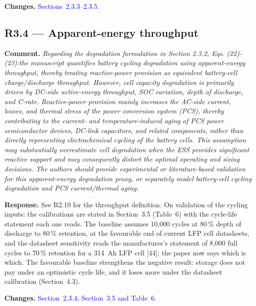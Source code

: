 \documentclass[11pt]{article}
\newcommand{\rcomment}[1]{\par\medskip\noindent\textbf{Comment.} \textit{#1}\par\smallskip}
\newcommand{\rresponse}[1]{\noindent\textbf{Response.} #1\par\smallskip}
\newcommand{\rchanges}[1]{\noindent\textbf{Changes.} \textcolor{blue}{#1}\par\medskip}
\begin{document}
\rchanges{Sections~2.3.3--2.3.5.}

\subsection*{R3.4 --- Apparent-energy throughput}
\rcomment{
Regarding the degradation formulation in Section 2.3.2, Eqs. (22)-(23):the manuscript quantifies battery cycling degradation using apparent-energy throughput, thereby treating reactive-power provision as equivalent battery-cell charge/discharge throughput. However, cell capacity degradation is primarily driven by DC-side active-energy throughput, SOC variation, depth of discharge, and C-rate. Reactive-power provision mainly increases the AC-side current, losses, and thermal stress of the power conversion system (PCS), thereby contributing to the current- and temperature-induced aging of PCS power semiconductor devices, DC-link capacitors, and related components, rather than directly representing electrochemical cycling of the battery cells. This assumption may substantially overestimate cell degradation when the ESS provides significant reactive support and may consequently distort the optimal operating and sizing decisions. The authors should provide experimental or literature-based validation for this apparent-energy degradation proxy, or separately model battery-cell cycling degradation and PCS current/thermal aging.
}
\rresponse{See R2.10 for the throughput definition. On validation of the cycling inputs: the calibrations are stated in Section~3.5 (Table~6) with the cycle-life statement each one reads. The baseline assumes 10,000 cycles at 80\,\% depth of discharge to 80\,\% retention, at the favourable end of current LFP cell datasheets, and the datasheet sensitivity reads the manufacturer's statement of 8,000 full cycles to 70\,\% retention for a 314~Ah LFP cell [44]; the paper now says which is which. The favourable baseline strengthens the negative result: storage does not pay under an optimistic cycle life, and it loses more under the datasheet calibration (Section~4.3).}
\rchanges{Section~2.3.4; Section~3.5 and Table~6.}
\end{document}
